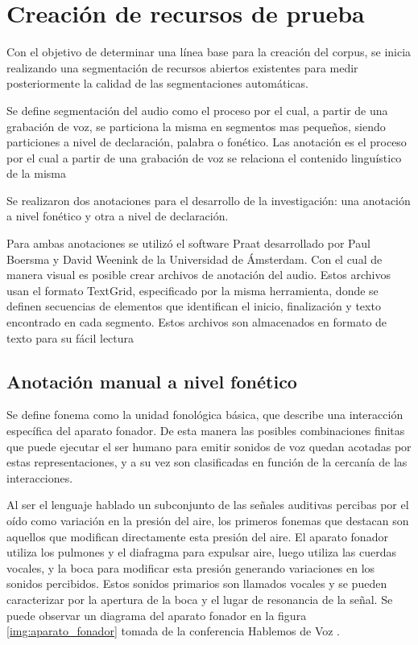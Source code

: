 \chapter{Creación de recursos de prueba}

Con el objetivo de determinar una línea base para la creación del corpus, se inicia realizando una segmentación de recursos abiertos existentes para medir posteriormente la calidad de las segmentaciones automáticas.

Se define segmentación del audio como el proceso por el cual, a partir de una grabación de voz, se particiona la misma en segmentos mas pequeños, siendo particiones a nivel de declaración, palabra o fonético. Las anotación es el proceso por el cual a partir de una grabación de voz se relaciona el contenido linguístico de la misma

Se realizaron dos anotaciones para el desarrollo de la investigación: una anotación a nivel fonético y otra a nivel de declaración.

Para ambas anotaciones se utilizó el software Praat \cite{Praat} desarrollado por Paul Boersma y David Weenink de la Universidad de Ámsterdam. Con el cual de manera visual es posible crear archivos de anotación del audio. Estos archivos usan el formato TextGrid, especificado por la misma herramienta, donde se definen secuencias de elementos que identifican el inicio, finalización y texto encontrado en cada segmento. Estos archivos son almacenados en formato de texto para su fácil lectura \cite{TextGrids}

\section{Anotación manual a nivel fonético}

Se define fonema como la unidad fonológica básica, que describe una interacción específica del aparato fonador. De esta manera las posibles combinaciones finitas que puede ejecutar el ser humano para emitir sonidos de voz quedan acotadas por estas representaciones, y a su vez son clasificadas en función de la cercanía de las interacciones.

Al ser el lenguaje hablado un subconjunto de las señales auditivas percibas por el oído como variación en la presión del aire, los primeros fonemas que destacan son aquellos que modifican directamente esta presión del aire. El aparato fonador utiliza los pulmones y el diafragma para expulsar aire, luego utiliza las cuerdas vocales, y la boca para modificar esta presión generando variaciones en los sonidos percibidos. Estos sonidos primarios son llamados vocales y se pueden caracterizar por la apertura de la boca y el lugar de resonancia de la señal. Se puede observar un diagrama del aparato fonador en la figura \ref{img:aparato_fonador} tomada de la conferencia Hablemos de Voz \cite{hableomsDeVoz}.

